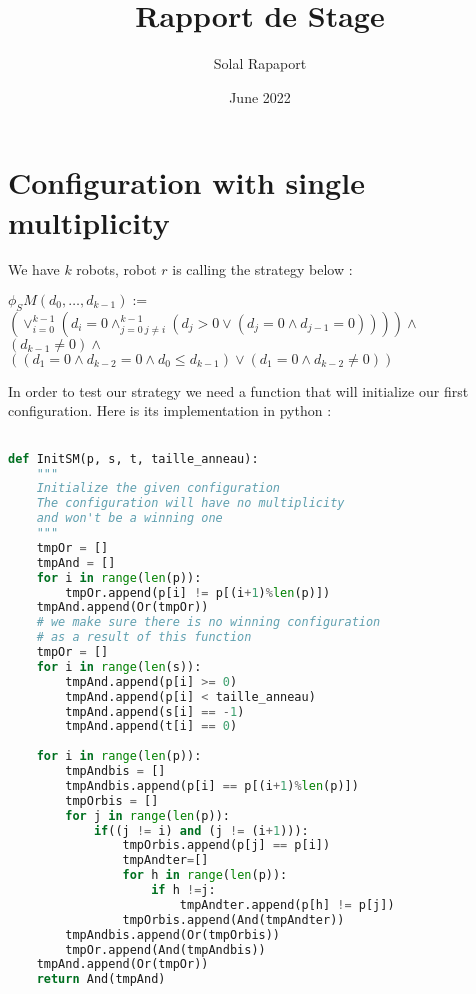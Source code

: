 \documentclass{article}
\title{Rapport de Stage}
\author{Solal Rapaport }
\date{June 2022}
\begin{document}
\maketitle

\section{Configuration with single multiplicity}

We have $k$ robots, robot $r$ is calling the strategy below :
\begin{center}
$\phi_SM(d_0, \ldots , d_{k-1}):=$\\
$(\lor_{i=0}^{k-1}(d_i = 0\land_{j=0\ j\not=i}^{k-1} (d_j > 0 \lor (d_j = 0 \land d_{j-1} = 0) ) ))\land$\\
$(d_{k-1} \not= 0) \land $\\
$((d_1 = 0 \land d_{k-2} = 0 \land d_0 \leq d_{k-1}) \lor (d_1 = 0 \land d_{k-2} \not= 0))$
\end{center}

In order to test our strategy we need a function that will initialize our first configuration. Here is its implementation in python :

\begin{lstlisting}[language=Python]

def InitSM(p, s, t, taille_anneau):
    """
    Initialize the given configuration
    The configuration will have no multiplicity
    and won't be a winning one
    """
    tmpOr = []
    tmpAnd = []
    for i in range(len(p)):
        tmpOr.append(p[i] != p[(i+1)%len(p)])
    tmpAnd.append(Or(tmpOr))
    # we make sure there is no winning configuration
    # as a result of this function
    tmpOr = []
    for i in range(len(s)):
        tmpAnd.append(p[i] >= 0)
        tmpAnd.append(p[i] < taille_anneau)
        tmpAnd.append(s[i] == -1)
        tmpAnd.append(t[i] == 0)
    
    for i in range(len(p)):
        tmpAndbis = []
        tmpAndbis.append(p[i] == p[(i+1)%len(p)])
        tmpOrbis = []
        for j in range(len(p)):
            if((j != i) and (j != (i+1))):
                tmpOrbis.append(p[j] == p[i])
                tmpAndter=[]
                for h in range(len(p)):
                    if h !=j:
                        tmpAndter.append(p[h] != p[j])
                tmpOrbis.append(And(tmpAndter))
        tmpAndbis.append(Or(tmpOrbis))
        tmpOr.append(And(tmpAndbis))
    tmpAnd.append(Or(tmpOr))
    return And(tmpAnd)
\end{lstlisting}
\end{document}
